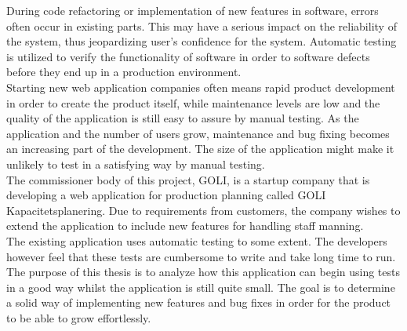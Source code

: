 During code refactoring or implementation of new features in software,
errors often occur in existing parts. This may have a serious impact on
the reliability of the system, thus jeopardizing user's confidence for
the system. Automatic testing is utilized to verify the functionality of
software in order to software defects before they end up in a production
environment.\\

Starting new web application companies often means rapid product
development in order to create the product itself, while maintenance
levels are low and the quality of the application is still easy to
assure by manual testing. As the application and the number of users
grow, maintenance and bug fixing becomes an increasing part of the
development. The size of the application might make it unlikely to
test in a satisfying way by manual testing.\\

The commissioner body of this project, GOLI, is a startup company that
is developing a web application for production planning called GOLI
Kapacitetsplanering. Due to requirements from customers, the company
wishes to extend the application to include new features for handling
staff manning. \\

The existing application uses automatic testing to some extent. The
developers however feel that these tests are cumbersome to write and
take long time to run. The purpose of this thesis is to analyze how
this application can begin using tests in a good way whilst the
application is still quite small. The goal is to determine a solid way
of implementing new features and bug fixes in order for the product to
be able to grow effortlessly.\\
